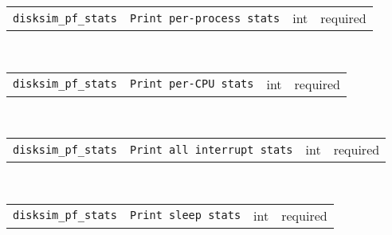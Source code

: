 \noindent 
\begin{tabular}{|p{1.5in}|p{3.5in}|p{0.5in}|p{0.5in}|}
\cline{1-4}
\texttt{disksim\_pf\_stats} & \texttt{Print per-process stats} & int & required \\ 
\cline{1-4}
\end{tabular}\\ 
\noindent 
\begin{tabular}{|p{1.5in}|p{3.5in}|p{0.5in}|p{0.5in}|}
\cline{1-4}
\texttt{disksim\_pf\_stats} & \texttt{Print per-CPU stats} & int & required \\ 
\cline{1-4}
\end{tabular}\\ 
\noindent 
\begin{tabular}{|p{1.5in}|p{3.5in}|p{0.5in}|p{0.5in}|}
\cline{1-4}
\texttt{disksim\_pf\_stats} & \texttt{Print all interrupt stats} & int & required \\ 
\cline{1-4}
\end{tabular}\\ 
\noindent 
\begin{tabular}{|p{1.5in}|p{3.5in}|p{0.5in}|p{0.5in}|}
\cline{1-4}
\texttt{disksim\_pf\_stats} & \texttt{Print sleep stats} & int & required \\ 
\cline{1-4}
\end{tabular}\\ 
